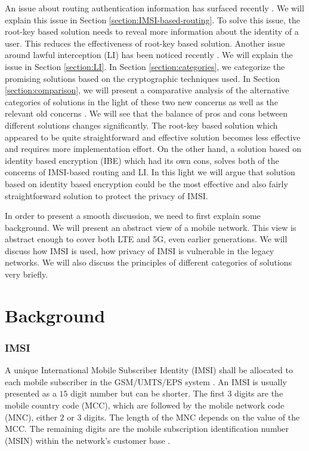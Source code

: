 \documentclass[conference]{IEEEtran}
\begin{document}
An issue about routing authentication information has surfaced recently \cite{SUCIRouting}. We will explain this issue in Section \ref{section:IMSI-based-routing}. To solve this issue, the root-key based solution needs to reveal more information about the identity of a user. This reduces the effectiveness of root-key based solution. Another issue around lawful interception (LI) has been noticed recently \cite{SUCIRouting}. We will explain the issue in Section \ref{section:LI}. In Section \ref{section:categories}, we categorize the promising solutions based on the cryptographic techniques used. In Section \ref{section:comparison}, we will present a comparative analysis of the alternative categories of solutions in the light of these two new concerns as well as the relevant old concerns \cite{ICTJournal, IBE_mohsin}. We will see that the balance of pros and cons between different solutions changes significantly. The root-key based solution which appeared to be quite straightforward and effective solution \cite{ICTJournal} becomes less effective and requires more implementation effort. On the other hand, a solution based on identity based encryption (IBE) \cite{ICTJournal,IBE_mohsin} which had its own cons, solves both of the concerns of IMSI-based routing and LI. In this light we will argue that solution based on identity based encryption could be the most effective and also fairly straightforward solution to protect the privacy of IMSI.

In order to present a smooth discussion, we need to first explain some background. We will present an abstract view of a mobile network. This view is abstract enough to cover both LTE and 5G, even earlier generations. We will discuss how IMSI is used, how privacy of IMSI is vulnerable in the legacy networks. We will also discuss the principles of different categories of solutions very briefly. 

\section{Background} \label{background}
\subsubsection{IMSI}
A unique International Mobile Subscriber Identity (IMSI) shall be allocated to each mobile subscriber in the GSM/UMTS/EPS system \cite{TS23003}. An IMSI is usually presented as a $15$ digit number but can be shorter. The first $3$ digits are the mobile country code (MCC), which are followed by the mobile network code (MNC), either $2$ or $3$ digits. The length of the MNC depends on the value of the MCC. The remaining digits are the mobile subscription identification number (MSIN) within the network's customer base \cite{TS23003}. 
\end{document}
